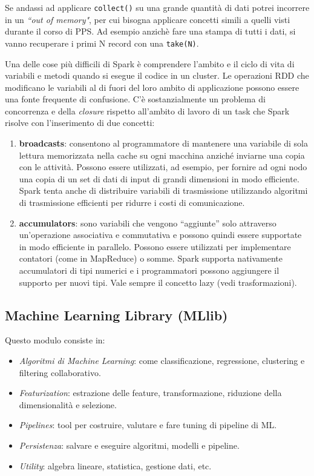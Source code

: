 \documentclass[12pt,italian]{article}
\begin{document}
\par Se andassi ad applicare \texttt{collect()} su una grande quantità di dati potrei incorrere in un \textit{``out of memory"}, per cui bisogna applicare concetti simili a quelli visti durante il corso di PPS. Ad esempio anzichè fare una stampa di tutti i dati, si vanno recuperare i primi N record con una \texttt{take(N)}.
\par Una delle cose più difficili di Spark è comprendere l'ambito e il ciclo di vita di variabili e metodi quando si esegue il codice in un cluster. Le operazioni RDD che modificano le variabili al di fuori del loro ambito di applicazione possono essere una fonte frequente di confusione. C'è sostanzialmente un problema di concorrenza e della \textit{closure} rispetto all'ambito di lavoro di un task che Spark risolve con l'inserimento di due concetti:
\begin{enumerate}
	\item \textbf{broadcasts}\label{sec:broadcasts}:  consentono al programmatore di mantenere una variabile di sola lettura memorizzata nella cache su ogni macchina anziché inviarne una copia con le attività. Possono essere utilizzati, ad esempio, per fornire ad ogni nodo una copia di un set di dati di input di grandi dimensioni in modo efficiente. Spark tenta anche di distribuire variabili di trasmissione utilizzando algoritmi di trasmissione efficienti per ridurre i costi di comunicazione.
	\item \textbf{accumulators}\label{sec:aoccumulators}: sono variabili che vengono “aggiunte” solo attraverso un'operazione associativa e commutativa e possono quindi essere supportate in modo efficiente in parallelo. Possono essere utilizzati per implementare contatori (come in MapReduce) o somme. Spark supporta nativamente accumulatori di tipi numerici e i programmatori possono aggiungere il supporto per nuovi tipi. Vale sempre il concetto lazy (vedi trasformazioni).
\end{enumerate}
\subsection{Machine Learning Library (MLlib)}
Questo modulo consiste in:
\begin{itemize}
	\item \textit{Algoritmi di Machine Learning}: come classificazione, regressione, clustering e filtering collaborativo.
	\item \textit{Featurization}: estrazione delle feature, transformazione, riduzione della dimensionalità e selezione.
	\item \textit{Pipelines}: tool per costruire, valutare e fare tuning di pipeline di ML.
	\item \textit{Persistenza}: salvare e eseguire algoritmi, modelli e pipeline.
	\item \textit{Utility}: algebra lineare, statistica, gestione dati, etc.
\end{itemize}
\end{document}
